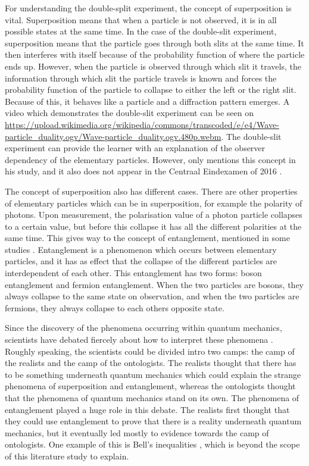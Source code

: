 \documentclass[11pt,twoside]{report} %
\begin{document}
For understanding the double-split experiment, the concept of superposition is vital. Superposition means that when a particle is not observed, it is in all possible states at the same time. In the case of the double-slit experiment, superposition means that the particle goes through both slits at the same time. It then interferes with itself because of the probability function of where the particle ends up. However, when the particle is observed through which slit it travels, the information through which slit the particle travels is known and forces the probability function of the particle to collapse to either the left or the right slit. Because of this, it behaves like a particle and a diffraction pattern emerges. A video which demonstrates the double-slit experiment can be seen on \url{https://upload.wikimedia.org/wikipedia/commons/transcoded/e/e4/Wave-particle_duality.ogv/Wave-particle_duality.ogv.480p.webm}. The double-slit experiment can provide the learner with an explanation of the observer dependency of the elementary particles. However, only  mentions this concept in his study, and it also does not appear in the Centraal Eindexamen of 2016 \cite{eindexamen2016}.

The concept of superposition also has different cases. There are other properties of elementary particles which can be in superposition, for example the polarity of photons. Upon measurement, the polarisation value of a photon particle collapses to a certain value, but before this collapse it has all the different polarities at the same time. This gives way to the concept of entanglement, mentioned in some studies \cite{henriksen, hobson, kuttner}. Entanglement is a phenomenon which occurs between elementary particles, and it has as effect that the collapse of the different particles are interdependent of each other. This entanglement has two forms: boson entanglement and fermion entanglement. When the two particles are bosons, they always collapse to the same state on observation, and when the two particles are fermions, they always collapse to each others opposite state.

Since the discovery of the phenomena occurring within quantum mechanics, scientists have debated fiercely about how to interpret these phenomena \cite{barnes}. Roughly speaking, the scientists could be divided intro two camps: the camp of the realists and the camp of the ontologists. The realists thought that there has to be something underneath quantum mechanics which could explain the strange phenomena of superposition and entanglement, whereas the ontologists thought that the phenomena of quantum mechanics stand on its own. The phenomena of entanglement played a huge role in this debate. The realists first thought that they could use entanglement to prove that there is a reality underneath quantum mechanics, but it eventually led mostly to evidence towards the camp of ontologists. One example of this is Bell's inequalities \cite{kuttner, muller}, which is beyond the scope of this literature study to explain.
\end{document}
